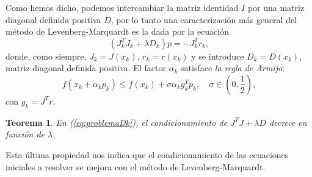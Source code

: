 \documentclass[11pt,a4paper]{book}
\newtheorem{theorem}{Teorema}[chapter]
\theoremstyle{definition}
\theoremstyle{remark}
\begin{document}
Como hemos dicho, podemos intercambiar la matriz identidad $I$ por una matriz diagonal definida positiva $D$, por lo tanto una caracterización más general del método de Levenberg-Marquardt es la dada por la ecuación
\begin{equation}
\label{eq:problemaDk}
(J_k^TJ_k+\lambda D_k)p = -J_k^Tr_k,
\end{equation}
donde, como siempre, $J_k=J(x_k)$, $r_k = r(x_k)$ y se introduce $D_k = D(x_k)$, matriz diagonal definida positiva. El factor $\alpha_k$ satisface \textit{la regla de Armijo}:
\begin{equation}
\label{eq:Armijo}
	f(x_k+\alpha_kp_k) \leq f(x_k) + \sigma \alpha_kg_k^Tp_k,\quad \sigma \in \left( 0,\frac{1}{2} \right),
\end{equation}
con $g_k= J^Tr$.
\begin{theorem}
	En (\ref{eq:problemaDk}), el condicionamiento de $J^TJ+\lambda D$ decrece en función de $\lambda$.
\end{theorem}

Esta última propiedad nos indica que el condicionamiento de las ecuaciones iniciales a resolver se mejora con el método de Levenberg-Marquardt.
\end{document}
